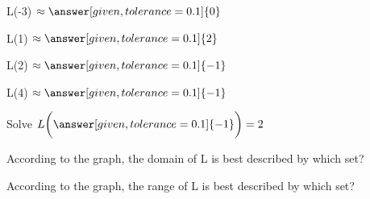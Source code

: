 \documentclass{ximera}
\begin{document}
\begin{exercise}
L(-3)   $\approx \answer[given,tolerance=0.1]{0}$
\end{exercise}


\begin{exercise}
L(1)   $\approx \answer[given,tolerance=0.1]{2}$
\end{exercise}


\begin{exercise}
L(2)   $\approx \answer[given,tolerance=0.1]{-1}$
\end{exercise}


\begin{exercise}
L(4)   $\approx \answer[given,tolerance=0.1]{-1}$
\end{exercise}



\begin{exercise}
Solve   $ L\bigg( \answer[given,tolerance=0.1]{-1} \bigg) = 2$
\end{exercise}







\begin{exercise}
According to the graph, the domain of L is best described by which set?
\begin{multipleChoice}
\choice{$[-2, 3.5)$}
\choice[correct]{$(-\infty, \infty)$}
\choice{$[-2, 3.5]$}
\end{multipleChoice}
\end{exercise}

\begin{exercise}
According to the graph, the range of L is best described by which set?
\begin{multipleChoice}
\choice{$[-2.4, 0.5] \cup [1, 4)$}
\choice[correct]{$(-\infty, \infty)$}
\choice{$[-2.4, 0.5] \cup [1, 4) \cup \{ 2 \}$}
\end{multipleChoice}
\end{exercise}
\end{document}
